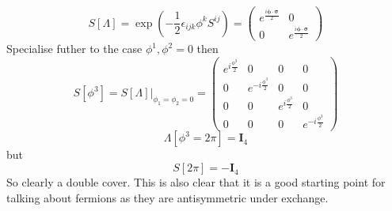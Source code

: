 \documentclass[12pt, a4paper, twoside, titlepage]{article}
\begin{document}
                                $$
                                S[\Lambda] = \exp (-\frac{1}{2}  \epsilon_{ijk} \phi^k S^{ij})= \begin{pmatrix} e^{\frac{i\bm \phi \cdot \bm \sigma}{2}} & 0 \\ 0 & e^{\frac{i \bm \phi \cdot \bm \sigma}{2}} \end{pmatrix}
                                $$
                                Specialise futher to the case $\phi^1, \phi^2 = 0$ then
                                $$
                                S[\phi^3] = S[\Lambda]|_{\phi_1 = \phi_2 = 0} = \begin{pmatrix} e^{i \frac{\phi^3}{2}} & 0 & 0 & 0 \\
                                        0 & e^{-i \frac{\phi^3}{2}} & 0 & 0\\
                                        0 & 0 & e^{i \frac{\phi^3}{2}} & 0 \\
                                0 & 0 & 0 & e^{-i \frac{\phi^3}{2}} \end{pmatrix}
                                $$
                                $$
                                \Lambda[ \phi^3 = 2\pi] = \bm I_4
                                $$
                                but 
                                $$
                                S[2\pi] = - \bm I_4
                                $$
                                So clearly a double cover. This is also clear that it is a good starting point for talking about fermions as they are antisymmetric under exchange.
\end{document}
